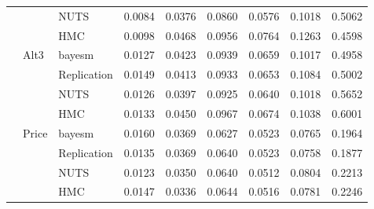 \begin{tabular}{lllcccccc}
 &  & NUTS & 0.0084 & 0.0376 & 0.0860 & 0.0576 & 0.1018 & 0.5062 \\
 &  & HMC & 0.0098 & 0.0468 & 0.0956 & 0.0764 & 0.1263 & 0.4598 \\
 & Alt3 & bayesm & 0.0127 & 0.0423 & 0.0939 & 0.0659 & 0.1017 & 0.4958 \\
 &  & Replication & 0.0149 & 0.0413 & 0.0933 & 0.0653 & 0.1084 & 0.5002 \\
 &  & NUTS & 0.0126 & 0.0397 & 0.0925 & 0.0640 & 0.1018 & 0.5652 \\
 &  & HMC & 0.0133 & 0.0450 & 0.0967 & 0.0674 & 0.1038 & 0.6001 \\
 & Price & bayesm & 0.0160 & 0.0369 & 0.0627 & 0.0523 & 0.0765 & 0.1964 \\
 &  & Replication & 0.0135 & 0.0369 & 0.0640 & 0.0523 & 0.0758 & 0.1877 \\
 &  & NUTS & 0.0123 & 0.0350 & 0.0640 & 0.0512 & 0.0804 & 0.2213 \\
 &  & HMC & 0.0147 & 0.0336 & 0.0644 & 0.0516 & 0.0781 & 0.2246 \\
\bottomrule
\end{tabular}
